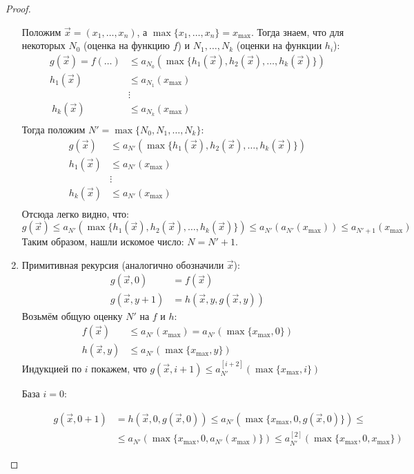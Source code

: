 \begin{proof}
\begin{enumerate}
		Положим $\vec x = (x_1, \dots, x_n)$, а $\max \{ x_1, \dots, x_n \} = x_{\max}$.
		Тогда знаем, что для некоторых $N_0$ (оценка на функцию $f$) и $N_1, \dots, N_k$ (оценки на функции $h_i$):
		\begin{align*}
			g(\vec x) = f(\dots) &\le a_{N_0}(\max \{ h_1(\vec x), h_2(\vec x), \dots, h_k(\vec x) \}) \\
			h_1(\vec x) &\le a_{N_1}(x_{\max}) \\
			&\vdots \\\
			h_k(\vec x) &\le a_{N_k}(x_{\max}) \\
		\end{align*}
		Тогда положим $N'=\max \{ N_0, N_1, \dots, N_k \}$:
		\begin{align*}
			g(\vec x) &\le a_{N'}(\max \{ h_1(\vec x), h_2(\vec x), \dots, h_k(\vec x) \}) \\
			h_1(\vec x) &\le a_{N'}(x_{\max}) \\
			&\vdots \\
			h_k(\vec x) &\le a_{N'}(x_{\max}) \\
		\end{align*}
		Отсюда легко видно, что:
		\[
			g(\vec x) \le a_{N'}(\max \{ h_1(\vec x), h_2(\vec x), \dots, h_k(\vec x) \}) \le a_{N'}(a_{N'}(x_{\max})) \le a_{N'+1}(x_{\max})
		\]
		Таким образом, нашли искомое число: $N=N'+1$.
	\item
		Примитивная рекурсия (аналогично обозначили $\vec x$):
		\begin{align*}
			g(\vec x, 0) &= f(\vec x) \\
			g(\vec x, y + 1) &= h(\vec x, y, g(\vec x, y))
		\end{align*}
		Возьмём общую оценку $N'$ на $f$ и $h$:
		\begin{align*}
			f(\vec x) &\le a_{N'}(x_{\max}) = a_{N'}(\max \{ x_{\max}, 0 \}) \\
			h(\vec x, y) &\le a_{N'}(\max \{ x_{\max}, y \})
		\end{align*}
		Индукцией по $i$ покажем, что $g(\vec x, i + 1) \le a_{N'}^{[i+2]}(\max \{ x_{\max}, i \})$

		\begin{description}
			\item[База $i=0$:]
				\begin{align*}
				g(\vec x, 0 + 1)
				&= h(\vec x, 0, g(\vec x, 0))
				\le a_{N'}(\max\{x_{\max}, 0, g(\vec x, 0)\}) \le \\
				&\le a_{N'}(\max\{x_{\max}, 0, a_{N'}(x_{\max})\})
				\le a_{N'}^{[2]}(\max\{x_{\max}, 0, x_{\max}\})
				\end{align*}


\end{description}
\end{enumerate}
\end{proof}
